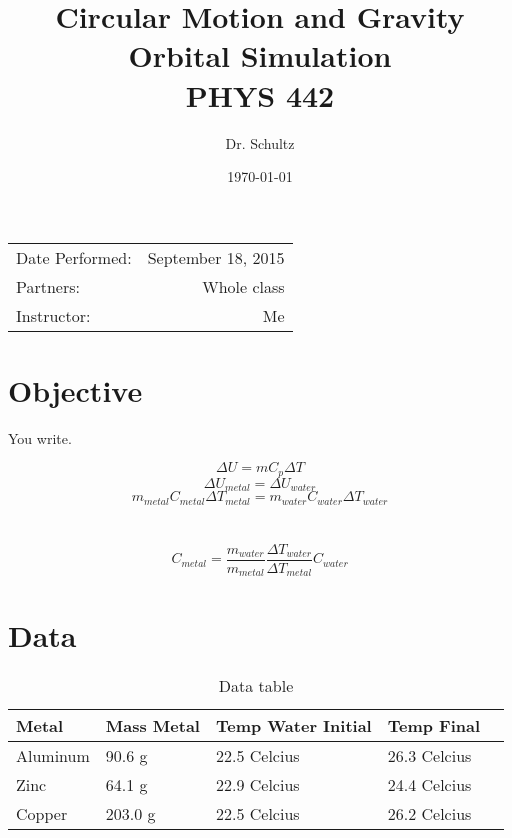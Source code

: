 \documentclass{article}
\title{Circular Motion and Gravity \\ Orbital Simulation \\ PHYS 442} %
\author{Dr. Schultz } %
\date{\today} %
\begin{document}
\maketitle %

\begin{center}
\begin{tabular}{l r}
Date Performed: & September 18, 2015 \\ %
Partners: & Whole class \\ %
Instructor: & Me %
\end{tabular}
\end{center}



\section{Objective}

You write.

$$\Delta U=mC_p\Delta T$$
$$\Delta U_{metal}=\Delta U_{water}$$
$$m_{metal}C_{metal}\Delta T_{metal}=m_{water}C_{water}\Delta T_{water}$$\\
\\
$$C_{metal}=\frac{m_{water}}{m_{metal}}  \frac{\Delta T_{water}}{\Delta T_{metal}}    C_{water}$$

\section{Data}

\begin{table}[htbp]
\begin{center}
\footnotesize
\begin{tabular}{lllll}
\toprule
 Metal   & Mass Metal & Temp Water Initial & Temp Final \\                                                      
\midrule
  
    Aluminum   & 90.6 g           & 22.5 Celcius & 26.3 Celcius   \\
    Zinc   & 64.1 g           & 22.9 Celcius  & 24.4 Celcius  \\
    Copper     & 203.0 g           & 22.5 Celcius & 26.2 Celcius  \\
    
\bottomrule
\end{tabular}
\end{center}
  \caption{Data table}
  \label{tab:font-sizes}
\end{table}
\end{document}
